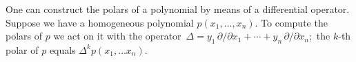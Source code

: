 \documentclass[12pt]{article}
\begin{document}
One can construct the polars of a polynomial by means of a differential
operator.  Suppose we have a homogeneous polynomial $p (x_1, \ldots, x_n)$.
To compute the polars of $p$ we act on it with the operator 
\,$\Delta = y_1 \, \partial / \partial x_1 + \cdots 
+y_n \, \partial / \partial x_n$;\, the $k$-th polar of $p$ equals $\Delta^k p(x_1, \ldots x_n)$.
\end{document}
